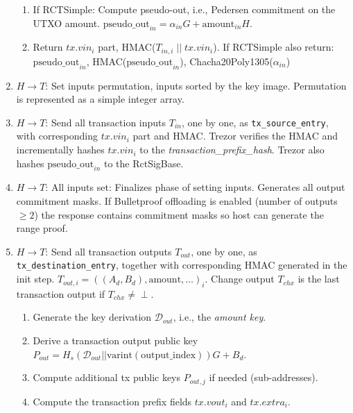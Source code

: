 \documentclass[]{article}
\begin{document}
\begin{enumerate}
\begin{enumerate}
		\item If RCTSimple: Compute pseudo-out, i.e., Pedersen commitment on the UTXO amount. $ \text{pseudo\_out}_{in} = \alpha_{in} G + \text{amount}_{in} H$.
		
		\item Return $tx.vin_i$ part, HMAC($T_{in,i} \; || \; tx.vin_i$). If RCTSimple also return: $\text{pseudo\_out}_{in}$, HMAC($\text{pseudo\_out}_{in}$), Chacha20Poly1305($\alpha_{in}$)
	\end{enumerate} 

	\item $H \rightarrow T$: Set inputs permutation, inputs sorted by the key image. Permutation is represented as a simple integer array.
	
	\item $H \rightarrow T$: Send all transaction inputs $T_{in}$, one by one, as \verb|tx_source_entry|, with corresponding $tx.vin_i$ part and HMAC. Trezor verifies the HMAC and incrementally hashes $tx.vin_i$ to the \emph{transaction\_prefix\_hash}. Trezor also hashes $\text{pseudo\_out}_{in}$ to the RctSigBase.
	
	\item $H \rightarrow T$: All inputs set: Finalizes phase of setting inputs. Generates all output commitment masks. If Bulletproof offloading is enabled (number of outputs $\ge 2$) the response contains commitment masks so host can generate the range proof.
	
	\item $H \rightarrow T$: Send all transaction outputs $T_{out}$, one by one, as \verb|tx_destination_entry|, together with corresponding HMAC generated in the init step. $T_{out,i} = ((A_d, B_d), \text{amount}, \dots)_i$. Change output $T_{chx}$ is the last transaction output if $T_{chx} \neq \perp$.
	\begin{enumerate}			
		\item Generate the key derivation $\mathcal{D}_{out}$, i.e., the \emph{amount key}.
		
		\item Derive a transaction output public key $P_{out} = H_s(\mathcal{D}_{out} || \text{varint}(\text{output\_index}))G + B_d$.
		
		\item Compute additional tx public keys $P_{out,j}$ if needed (sub-addresses).
		
        \item Compute the transaction prefix fields $tx.vout_i$ and $tx.extra_i$.
        

\end{enumerate}
\end{enumerate}
\end{document}
